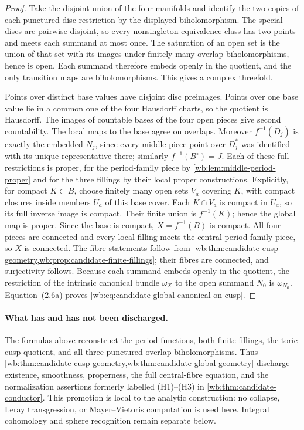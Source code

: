 \begin{proof}
Take the disjoint union of the four manifolds and identify the two copies of
each punctured-disc restriction by the displayed biholomorphism.  The special
discs are pairwise disjoint, so every nonsingleton equivalence class has two
points and meets each summand at most once.  The saturation of an open set is
the union of that set with its images under finitely many overlap
biholomorphisms, hence is open.  Each summand therefore embeds openly in the
quotient, and the only transition maps are biholomorphisms.  This gives a
complex threefold.

Points over distinct base values have disjoint disc preimages.  Points over
one base value lie in a common one of the four Hausdorff charts, so the
quotient is Hausdorff.  The images of countable bases of the four open
pieces give second countability.  The local maps to the base agree on
overlaps.  Moreover \(f^{-1}(D_j)\) is exactly the embedded \(N_j\),
since every middle-piece point over \(D_j^*\) was identified with its
unique representative there; similarly \(f^{-1}(B^\circ)=J\).  Each
of these full restrictions is proper, for the period-family piece by
\cref{wb:lem:middle-period-proper} and for the three fillings by their local
proper constructions.  Explicitly, for compact \(K\subset B\), choose
finitely many open sets \(V_a\) covering \(K\), with compact closures
inside members \(U_a\) of this base cover.  Each
\(K\cap\overline V_a\) is compact in \(U_a\), so its full inverse
image is compact.  Their finite union is \(f^{-1}(K)\); hence the global
map is proper.  Since the base is compact, \(X=f^{-1}(B)\) is compact.
All four pieces are connected and every local filling meets the central
period-family piece, so \(X\) is connected.  The fibre statements follow
from \cref{wb:thm:candidate-cusp-geometry,wb:prop:candidate-finite-fillings}; their
fibres are connected, and surjectivity follows.
Because each summand embeds openly in the quotient, the restriction of the
intrinsic canonical bundle \(\omega_X\) to the open summand \(N_0\) is
\(\omega_{N_0}\).  Equation~(2.6a) proves
\cref{wb:eq:candidate-global-canonical-on-cusp}.
\end{proof}

\paragraph{What has and has not been discharged.}
The formulas above reconstruct the period functions, both finite fillings,
the toric cusp quotient, and all three punctured-overlap biholomorphisms.
Thus \cref{wb:thm:candidate-cusp-geometry,wb:thm:candidate-global-geometry}
discharge existence, smoothness, properness,
the full central-fibre equation, and the normalization assertions formerly
labelled (H1)--(H3) in \cref{wb:thm:candidate-conductor}.  This promotion is
local to the analytic construction: no collapse, Leray transgression, or
Mayer--Vietoris computation is used here.  Integral cohomology and sphere
recognition remain separate below.
